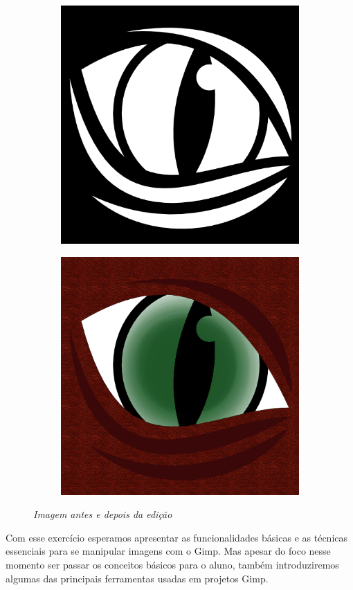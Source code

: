 \documentclass[12pt,onecolumn]{article}
\begin{document}
  \begin{figure}
  \centering
  \begin{subfigure}{.5\textwidth}
    \centering
    \includegraphics[width=.7\linewidth]{beast-eye.png}
    \label{fig:ex1_before}
  \end{subfigure}%
  \begin{subfigure}{.5\textwidth}
    \centering
    \includegraphics[width=.7\linewidth]{draft00.png}
    \label{fig:ex1_after}
  \end{subfigure}
  \caption{
    \footnotesize
    \it
    Imagem antes e depois da edição
  }
  \label{fig:intro}
  \end{figure}
  
  Com esse exercício esperamos apresentar as funcionalidades básicas e as
  técnicas essenciais para se manipular imagens com o Gimp. Mas apesar do foco
  nesse momento ser passar os conceitos básicos para o aluno, também
  introduziremos algumas das principais ferramentas usadas em projetos Gimp.
  
\end{document}
